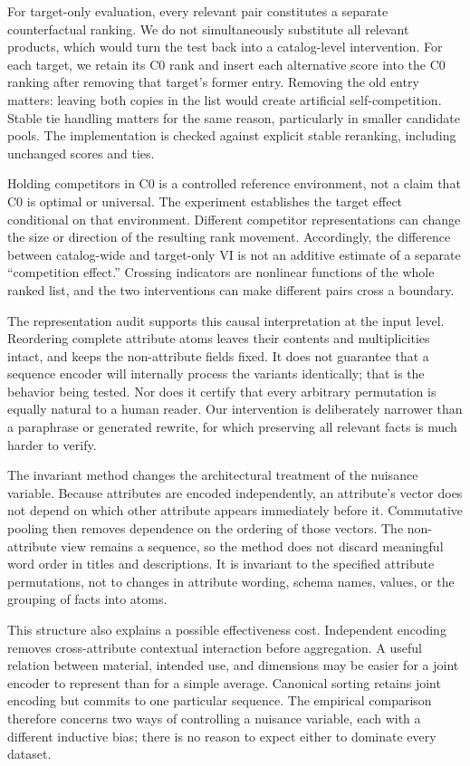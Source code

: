 For target-only evaluation, every relevant pair constitutes a separate counterfactual ranking. We do not simultaneously substitute all relevant products, which would turn the test back into a catalog-level intervention. For each target, we retain its C0 rank and insert each alternative score into the C0 ranking after removing that target's former entry. Removing the old entry matters: leaving both copies in the list would create artificial self-competition. Stable tie handling matters for the same reason, particularly in smaller candidate pools. The implementation is checked against explicit stable reranking, including unchanged scores and ties.

Holding competitors in C0 is a controlled reference environment, not a claim that C0 is optimal or universal. The experiment establishes the target effect conditional on that environment. Different competitor representations can change the size or direction of the resulting rank movement. Accordingly, the difference between catalog-wide and target-only VI is not an additive estimate of a separate ``competition effect.'' Crossing indicators are nonlinear functions of the whole ranked list, and the two interventions can make different pairs cross a boundary.

The representation audit supports this causal interpretation at the input level. Reordering complete attribute atoms leaves their contents and multiplicities intact, and keeps the non-attribute fields fixed. It does not guarantee that a sequence encoder will internally process the variants identically; that is the behavior being tested. Nor does it certify that every arbitrary permutation is equally natural to a human reader. Our intervention is deliberately narrower than a paraphrase or generated rewrite, for which preserving all relevant facts is much harder to verify.

The invariant method changes the architectural treatment of the nuisance variable. Because attributes are encoded independently, an attribute's vector does not depend on which other attribute appears immediately before it. Commutative pooling then removes dependence on the ordering of those vectors. The non-attribute view remains a sequence, so the method does not discard meaningful word order in titles and descriptions. It is invariant to the specified attribute permutations, not to changes in attribute wording, schema names, values, or the grouping of facts into atoms.

This structure also explains a possible effectiveness cost. Independent encoding removes cross-attribute contextual interaction before aggregation. A useful relation between material, intended use, and dimensions may be easier for a joint encoder to represent than for a simple average. Canonical sorting retains joint encoding but commits to one particular sequence. The empirical comparison therefore concerns two ways of controlling a nuisance variable, each with a different inductive bias; there is no reason to expect either to dominate every dataset.
